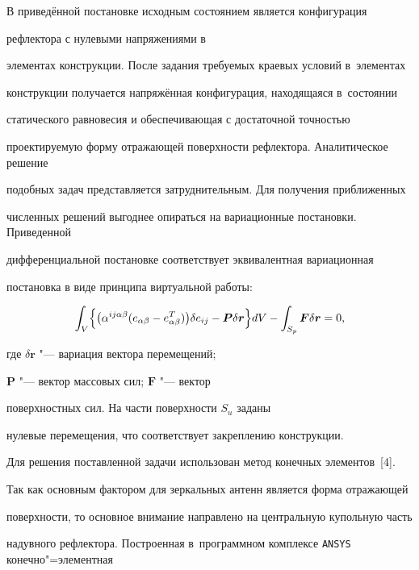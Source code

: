 В приведённой постановке исходным состоянием является конфигурация 

рефлектора с нулевыми напряжениями в 

элементах конструкции. После задания требуемых краевых условий в~элементах 

конструкции получается напряжённая конфигурация, находящаяся в~состоянии 

статического равновесия и обеспечивающая с достаточной точностью 

проектируемую форму отражающей поверхности рефлектора. Аналитическое решение 

подобных задач представляется затруднительным. Для получения приближенных 

численных решений выгоднее опираться на вариационные постановки. Приведенной 

дифференциальной постановке соответствует эквивалентная вариационная 

постановка в виде принципа виртуальной работы: 

\begin{equation*}

\label{belkov:eq10}

\int_V 

\Bigl\{ \bigl( \alpha ^{ij\alpha \beta }( e_{\alpha \beta } -e_{\alpha \beta }^T ) \bigr)

\delta e_{ij} - \boldsymbol  P\delta \boldsymbol  r \Bigr\} dV-\int_{S_p } \boldsymbol F\delta \boldsymbol r=0 ,

\end{equation*}

где $\delta \boldsymbol r$ "--- вариация вектора перемещений; 

$\boldsymbol P$ "--- вектор массовых сил; $\boldsymbol F$ "--- вектор 

поверхностных сил. На части поверхности $S_{u}$ заданы 

нулевые перемещения, что соответствует закреплению конструкции.






Для решения поставленной задачи использован метод конечных элементов~[4]. 

Так как основным фактором для зеркальных антенн является форма отражающей 

поверхности, то основное внимание направлено на центральную купольную часть 

надувного рефлектора. Построенная в~программном комплексе {\tt ANSYS} конечно"=элементная 

